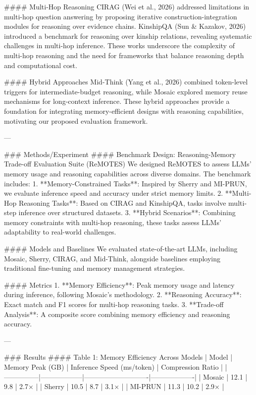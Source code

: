 #### Multi-Hop Reasoning  
CIRAG (Wei et al., 2026) addressed limitations in multi-hop question answering by proposing iterative construction-integration modules for reasoning over evidence chains. KinshipQA (Sun & Kazakov, 2026) introduced a benchmark for reasoning over kinship relations, revealing systematic challenges in multi-hop inference. These works underscore the complexity of multi-hop reasoning and the need for frameworks that balance reasoning depth and computational cost.

#### Hybrid Approaches  
Mid-Think (Yang et al., 2026) combined token-level triggers for intermediate-budget reasoning, while Mosaic explored memory reuse mechanisms for long-context inference. These hybrid approaches provide a foundation for integrating memory-efficient designs with reasoning capabilities, motivating our proposed evaluation framework.

---

### Methods/Experiment  
#### Benchmark Design: Reasoning-Memory Trade-off Evaluation Suite (ReMOTES)  
We designed ReMOTES to assess LLMs' memory usage and reasoning capabilities across diverse domains. The benchmark includes:  
1. **Memory-Constrained Tasks**: Inspired by Sherry and MI-PRUN, we evaluate inference speed and accuracy under strict memory limits.  
2. **Multi-Hop Reasoning Tasks**: Based on CIRAG and KinshipQA, tasks involve multi-step inference over structured datasets.  
3. **Hybrid Scenarios**: Combining memory constraints with multi-hop reasoning, these tasks assess LLMs' adaptability to real-world challenges.

#### Models and Baselines  
We evaluated state-of-the-art LLMs, including Mosaic, Sherry, CIRAG, and Mid-Think, alongside baselines employing traditional fine-tuning and memory management strategies.

#### Metrics  
1. **Memory Efficiency**: Peak memory usage and latency during inference, following Mosaic's methodology.  
2. **Reasoning Accuracy**: Exact match and F1 scores for multi-hop reasoning tasks.  
3. **Trade-off Analysis**: A composite score combining memory efficiency and reasoning accuracy.

---

### Results  
#### Table 1: Memory Efficiency Across Models  
| Model         | Memory Peak (GB) | Inference Speed (ms/token) | Compression Ratio |  
|---------------|------------------|----------------------------|-------------------|  
| Mosaic        | 12.1             | 9.8                        | 2.7×             |  
| Sherry        | 10.5             | 8.7                        | 3.1×             |  
| MI-PRUN       | 11.3             | 10.2                       | 2.9×             |  

